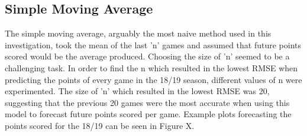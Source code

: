 \documentclass[a4paper,11pt,twoside]{article}
\begin{document}
\subsection{Simple Moving Average}

The simple moving average, arguably the most naive method used in this investigation, took  the mean of the last 'n' games and assumed that future points scored would be the average produced. Choosing the size of 'n' seemed to be a challenging task. In order to find the n which resulted in the lowest RMSE when predicting the points of every game in the 18/19 season, different values of n were experimented. The size of 'n' which resulted in the lowest RMSE was 20, suggesting that the previous 20 games were the most accurate when using this model to forecast future points scored per game. Example plots forecasting the points scored for the 18/19 can be seen in Figure X.
\end{document}
